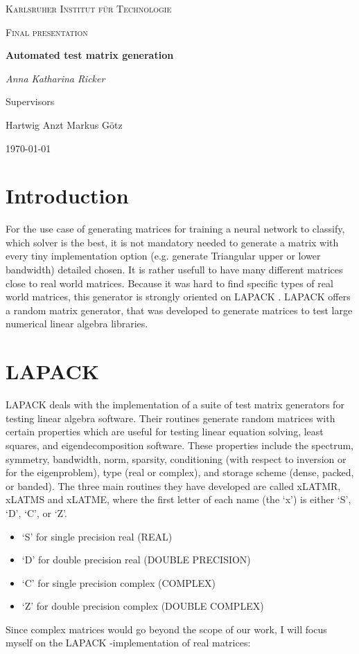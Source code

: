 \documentclass[a4paper]{article}
\begin{document}
	
	\begin{titlepage}
		\centering
		{\scshape\LARGE Karlsruher Institut für Technologie\par}
		\vspace{1cm}
		{\scshape\Large Final presentation\par}
		\vspace{1.5cm}
		{\huge\bfseries Automated test matrix generation\par}
		\vspace {2cm}
		
		{\Large\itshape Anna Katharina Ricker\par}
		
		\vfill
		Supervisors\par
		Hartwig Anzt
		Markus G\"{o}tz
		
		\vfill
		{\large\today\par}
	\end{titlepage}
	
	\tableofcontents
	\newpage
	
\section{Introduction}	
For the use case of generating matrices for training a neural network to classify, which solver is the best, it is not mandatory needed to generate a matrix with every tiny implementation option (e.g. generate Triangular upper or lower bandwidth) detailed chosen. 
It is rather usefull to have many different matrices close to real world matrices. Because it was hard to find specific types of real world matrices, this generator is strongly oriented on LAPACK \cite{LAPACK}. LAPACK  offers a random matrix generator, that was developed to generate matrices to test large numerical linear algebra libraries. 

\section{LAPACK}
LAPACK deals with the implementation of a suite of test matrix generators for testing linear algebra software. Their routines generate random matrices with certain properties which are useful for testing linear equation solving, least squares, and eigendecomposition software. These properties include the spectrum, symmetry, bandwidth, norm, sparsity, conditioning  (with respect to inversion or for the eigenproblem), type (real or complex), and storage scheme (dense, packed, or banded).
The three main routines they have developed are called xLATMR, xLATMS and xLATME, where the first letter of each name (the `x') is either `S', `D', `C', or `Z'. 
\begin{itemize}
\item ‘S’ for single precision real (REAL)
\item ‘D’ for double precision real (DOUBLE PRECISION)
\item ‘C’ for single precision complex (COMPLEX)
\item ‘Z’ for double precision complex (DOUBLE COMPLEX)
\end{itemize}
Since complex matrices would go beyond the scope of our work, I will focus myself on the LAPACK -implementation of real matrices:
\end{document}
